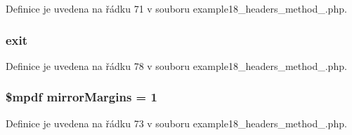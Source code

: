 Definice je uvedena na řádku 71 v souboru example18\-\_\-headers\-\_\-method\-\_.\-php.

\hypertarget{example18__headers__method__4_8php_a6733eb5f605d09eaede9845835d71c4e}{
\subsubsection[{exit}]{\setlength{\rightskip}{0pt plus 5cm}exit}}\label{example18__headers__method__4_8php_a6733eb5f605d09eaede9845835d71c4e}


Definice je uvedena na řádku 78 v souboru example18\-\_\-headers\-\_\-method\-\_.\-php.

\hypertarget{example18__headers__method__4_8php_a24c284cb7774410f65953584ea1fd9c1}{
\subsubsection[{mirror\-Margins}]{\setlength{\rightskip}{0pt plus 5cm}\$mpdf mirror\-Margins = 1}}\label{example18__headers__method__4_8php_a24c284cb7774410f65953584ea1fd9c1}


Definice je uvedena na řádku 73 v souboru example18\-\_\-headers\-\_\-method\-\_.\-php.

